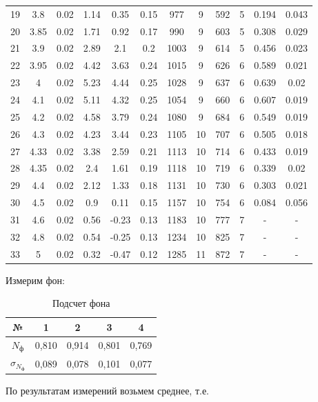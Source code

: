 \documentclass[12pt]{kiarticle} %
\begin{document}
\begin{table}[h!]
\begin{center}
\begin{tabular}{|c|c|c|c|c|c|c|c|c|c|c|c|}
19 & 3.8 & 0.02 & 1.14 & 0.35 & 0.15 & 977 & 9 & 592 & 5 & 0.194 & 0.043 \\
20 & 3.85 & 0.02 & 1.71 & 0.92 & 0.17 & 990 & 9 & 603 & 5 & 0.308 & 0.029 \\
21 & 3.9 & 0.02 & 2.89 & 2.1 & 0.2 & 1003 & 9 & 614 & 5 & 0.456 & 0.023 \\
22 & 3.95 & 0.02 & 4.42 & 3.63 & 0.24 & 1015 & 9 & 626 & 6 & 0.589 & 0.021 \\
23 & 4 & 0.02 & 5.23 & 4.44 & 0.25 & 1028 & 9 & 637 & 6 & 0.639 & 0.02 \\
24 & 4.1 & 0.02 & 5.11 & 4.32 & 0.25 & 1054 & 9 & 660 & 6 & 0.607 & 0.019 \\
25 & 4.2 & 0.02 & 4.58 & 3.79 & 0.24 & 1080 & 9 & 684 & 6 & 0.549 & 0.019 \\
26 & 4.3 & 0.02 & 4.23 & 3.44 & 0.23 & 1105 & 10 & 707 & 6 & 0.505 & 0.018 \\
27 & 4.33 & 0.02 & 3.38 & 2.59 & 0.21 & 1113 & 10 & 714 & 6 & 0.433 & 0.019 \\
28 & 4.35 & 0.02 & 2.4 & 1.61 & 0.19 & 1118 & 10 & 719 & 6 & 0.339 & 0.02 \\
29 & 4.4 & 0.02 & 2.12 & 1.33 & 0.18 & 1131 & 10 & 730 & 6 & 0.303 & 0.021 \\
30 & 4.5 & 0.02 & 0.9 & 0.11 & 0.15 & 1157 & 10 & 754 & 6 & 0.084 & 0.056 \\
31 & 4.6 & 0.02 & 0.56 & -0.23 & 0.13 & 1183 & 10 & 777 & 7 & - & - \\
32 & 4.8 & 0.02 & 0.54 & -0.25 & 0.13 & 1234 & 10 & 825 & 7 &- & - \\
33 & 5 & 0.02 & 0.32 & -0.47 & 0.12 & 1285 & 11 & 872 & 7 & - & - \\
			\hline
		\end{tabular}
	\end{center}
	\label{table_1}
\end{table}

Измерим фон:
\begin{table}[H]
	\caption{Подсчет фона}
\begin{center}
	\begin{tabular}{|c|c|c|c|c|}
	\hline 
	№ & 1 & 2 & 3 & 4 \\ 
	\hline 
	$ N_ф $ & 0,810 & 0,914 & 0,801 & 0,769 \\ 
	\hline 
	$ \sigma_{N_ф }$ & 0,089 & 0,078 & 0,101 & 0,077 \\ 
	\hline 
\end{tabular}
\end{center} 
\end{table}
По результатам измерений возьмем среднее, т.е. 
\end{document}

